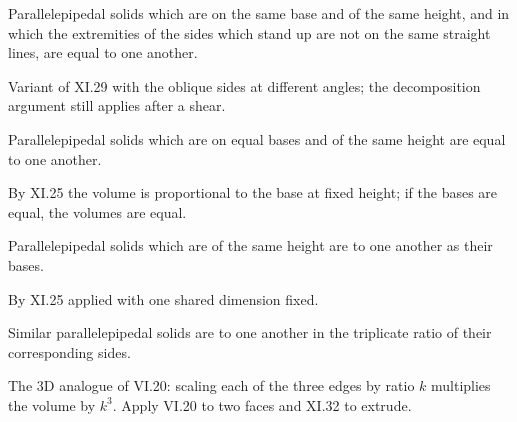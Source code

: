 \documentclass{rrxiv}
\begin{document}
\begin{claim}
\label{prop:XI.30}
Parallelepipedal solids which are on the same base and of the same
height, and in which the extremities of the sides which stand up are
not on the same straight lines, are equal to one another.
\end{claim}
\begin{evidence}[Proof of XI.30]
\label{ev:XI.30}
Variant of XI.29 with the oblique sides at different angles; the
decomposition argument still applies after a shear.
\end{evidence}

\begin{claim}
\label{prop:XI.31}
Parallelepipedal solids which are on equal bases and of the same
height are equal to one another.
\end{claim}
\begin{evidence}[Proof of XI.31]
\label{ev:XI.31}
By XI.25 the volume is proportional to the base at fixed height; if
the bases are equal, the volumes are equal.
\end{evidence}

\begin{claim}
\label{prop:XI.32}
Parallelepipedal solids which are of the same height are to one
another as their bases.
\end{claim}
\begin{evidence}[Proof of XI.32]
\label{ev:XI.32}
By XI.25 applied with one shared dimension fixed.
\end{evidence}

\begin{claim}
\label{prop:XI.33}
Similar parallelepipedal solids are to one another in the triplicate
ratio of their corresponding sides.
\end{claim}
\begin{evidence}[Proof of XI.33]
\label{ev:XI.33}
The 3D analogue of VI.20: scaling each of the three edges by ratio
$k$ multiplies the volume by $k^3$.  Apply VI.20 to two faces and
XI.32 to extrude.
\end{evidence}
\end{document}
